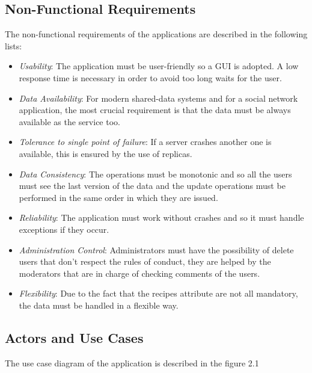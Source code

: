 \documentclass[a4paper]{report}
\begin{document}
\subsection{Non-Functional Requirements}
The non-functional requirements of the applications are described in the following lists:
\begin{itemize}
	\item \emph{Usability}: The application must be user-friendly so a GUI is adopted. A low response time is necessary in order to avoid too long waits for the user.
	\item \emph{Data Availability}: For modern shared-data systems and for a social network application, the most crucial requirement is that the data must be always available as the service too.
	\item \emph{Tolerance to single point of failure}: If a server crashes another one is available, this is ensured by the use of replicas.
	\item \emph{Data Consistency}: The operations must be monotonic and so all the users must see the last version of the data and the update operations must be performed in the same order in which they are issued.

	\item \emph{Reliability}: The application must work without crashes and so it must handle exceptions if they occur.
	
	\item \emph{Administration Control}: Administrators must have the possibility of delete users that don't respect the rules of conduct, they are helped by the moderators that are in charge of checking comments of the users. 
	
	\item \emph{Flexibility}: Due to the fact that the recipes attribute are not all mandatory, the data must be handled in a flexible way.  
\end{itemize}
\newpage
\subsection{Actors and Use Cases}
The use case diagram of the application is described in the figure 2.1
\end{document}
